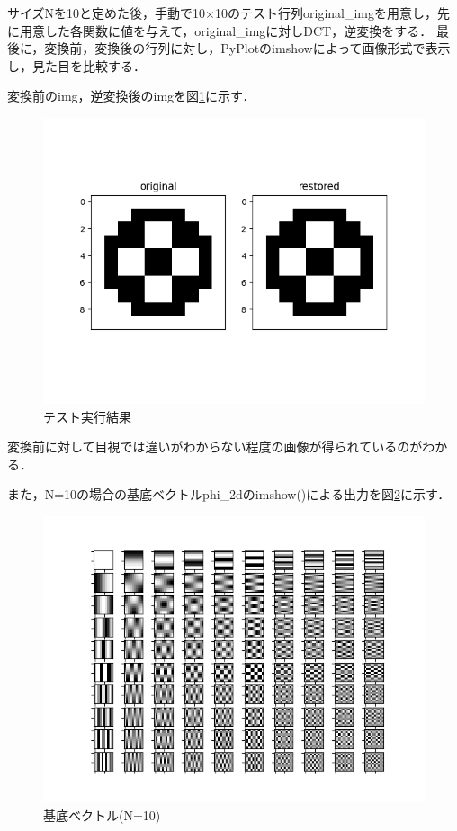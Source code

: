 \documentclass[uplatex,dvipdfmx,ja=standard]{bxjsarticle}
\begin{document}
\newpage

サイズNを10と定めた後，手動で10$\times $10のテスト行列original\_imgを用意し，先に用意した各関数に値を与えて，original\_imgに対しDCT，逆変換をする．
最後に，変換前，変換後の行列に対し，PyPlotのimshowによって画像形式で表示し，見た目を比較する．



変換前のimg，逆変換後のimgを図\ref{figure:test}に示す．

\begin{figure}[htb]
    \centering
    \includegraphics[scale=0.9]{../src/img/test.png}
    \caption{テスト実行結果}
    \label{figure:test}
\end{figure}

変換前に対して目視では違いがわからない程度の画像が得られているのがわかる．

\newpage

また，N=10の場合の基底ベクトルphi\_2dのimshow()による出力を図\ref{figure:base}に示す．


\begin{figure}[htb]
    \centering
    \includegraphics[scale=0.9]{../src/img/base.png}
    \caption{基底ベクトル(N=10)}
    \label{figure:base}
\end{figure}
\end{document}
